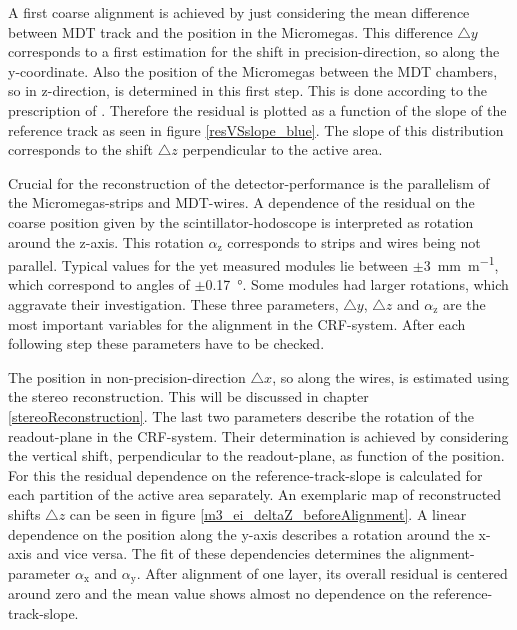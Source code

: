 \documentclass[
twoside,            %
BCOR1.4cm,          %
10pt,               %
headings=normal,    %
headsepline,        %
clearplainpage,		%
final,              %
div=14,
open=right,
bibliography=toc
]{scrreprt}
\begin{document}
A first coarse alignment is achieved by just considering the mean difference between MDT track and the position in the Micromegas.
This difference $\bigtriangleup y$ corresponds to a first estimation for the shift in precision-direction, so along the y-coordinate.
Also the position of the Micromegas between the MDT chambers, so in z-direction, is determined in this first step.
This is done according to the prescription of \cite{loeselThesis}.
Therefore the residual is plotted as a function of the slope of the reference track as seen in figure \ref{resVSslope_blue}.
The slope of this distribution corresponds to the shift $\bigtriangleup z$ perpendicular to the active area.

Crucial for the reconstruction of the detector-performance is the parallelism of the Micromegas-strips and MDT-wires.
A dependence of the residual on the coarse position given by the scintillator-hodoscope is interpreted as rotation around the z-axis.
This rotation $\alpha_{\mathrm{z}}$ corresponds to strips and wires being not parallel.
Typical values for the yet measured modules lie between $\pm$\SI{3}{\mm\per\m}, which correspond to angles of $\pm$\SI{0.17}{\degree}.
Some modules had larger rotations, which aggravate their investigation.
These three parameters, $\bigtriangleup y$, $\bigtriangleup z$ and $\alpha_{\mathrm{z}}$ are the most important variables for the alignment in the CRF-system.
After each following step these parameters have to be checked.

The position in non-precision-direction $\bigtriangleup x$, so along the wires, is estimated using the stereo reconstruction.
This will be discussed in chapter \ref{stereoReconstruction}.
The last two parameters describe the rotation of the readout-plane in the CRF-system.
Their determination is achieved by considering the vertical shift, perpendicular to the readout-plane, as function of the position.
For this the residual dependence on the reference-track-slope is calculated for each partition of the active area separately.
An exemplaric map of reconstructed shifts $\bigtriangleup z$ can be seen in figure \ref{m3_ei_deltaZ_beforeAlignment}.
A linear dependence on the position along the y-axis describes a rotation around the x-axis and vice versa.
The fit of these dependencies determines the alignment-parameter $\alpha_{\mathrm{x}}$ and $\alpha_{\mathrm{y}}$.
After alignment of one layer, its overall residual is centered around zero and the mean value shows almost no dependence on the reference-track-slope.
\end{document}
